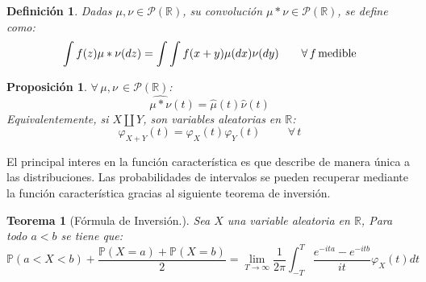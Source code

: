 \documentclass[a4paper]{article}
\newtheorem{definicion}{Definición}
\newtheorem{teorema}{Teorema}
\newtheorem{prop}{Proposici\'on}
\numberwithin{equation}{subsection}
\def\R{\mathbb R}
\def\to{\rightarrow}
\newcommand{\pb}{\mathbb{P}}
\begin{document}
\begin{definicion} Dadas $\mu,\nu \in \mathcal{P}(\R)$, su convolución $\mu\ast \nu \in \mathcal{P}(\R)$, se define como:
\[\int f(z)\mu\ast\nu(dz) = \int\int f(x+y)\mu(dx)\nu(dy)\hspace{0.7cm}\forall\,f\,\text{medible}\]
\end{definicion}
\begin{prop}$\forall\,\mu,\nu\,\in\mathcal{P}(\R)$:
\[\widehat{\mu\ast\nu}(t) = \hat{\mu}(t)\hat{\nu}(t)\]
Equivalentemente, si $X\amalg Y$, son variables aleatorias en $\R$:
\[\varphi_{X+Y}(t) = \varphi_X(t)\varphi_Y(t)\hspace{1cm}\forall\,t\]
\end{prop}

El principal interes en la función característica es que describe de manera única a las distribuciones. Las probabilidades de intervalos se pueden recuperar mediante la función característica gracias al siguiente teorema de inversión.

\begin{teorema}[Fórmula de Inversión.] Sea $X$ una variable aleatoria en $\R$, Para todo $a<b$ se tiene que:
\[\pb(a<X<b) + \frac{\pb(X=a)+\pb(X=b)}{2} = \lim_{T\to \infty}\frac{1}{2\pi}\int_{-T}^{T}\frac{e^{-ita}-e^{-itb}}{it}\varphi_X(t)dt\]

\end{teorema}
\end{document}
